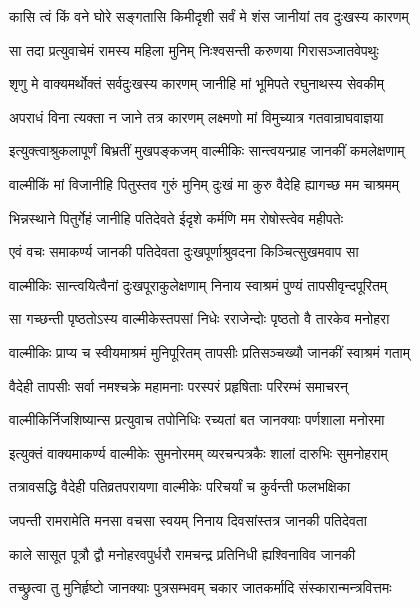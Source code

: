 \twolineshloka
{कासि त्वं किं वने घोरे सङ्गतासि किमीदृशी}
{सर्वं मे शंस जानीयां तव दुःखस्य कारणम्}%

\twolineshloka
{सा तदा प्रत्युवाचेमं रामस्य महिला मुनिम्}
{निःश्वसन्ती करुणया गिरासञ्जातवेपथुः}%

\twolineshloka
{शृणु मे वाक्यमर्थोक्तं सर्वदुःखस्य कारणम्}
{जानीहि मां भूमिपते रघुनाथस्य सेवकीम्}%

\twolineshloka
{अपराधं विना त्यक्ता न जाने तत्र कारणम्}
{लक्ष्मणो मां विमुच्यात्र गतवान्राघवाज्ञया}%

\twolineshloka
{इत्युक्त्वाश्रुकलापूर्णं बिभ्रतीं मुखपङ्कजम्}
{वाल्मीकिः सान्त्वयन्प्राह जानकीं कमलेक्षणाम्}%

\twolineshloka
{वाल्मीकिं मां विजानीहि पितुस्तव गुरुं मुनिम्}
{दुःखं मा कुरु वैदेहि ह्यागच्छ मम चाश्रमम्}%

\twolineshloka
{भिन्नस्थाने पितुर्गेहं जानीहि पतिदेवते}
{ईदृशे कर्मणि मम रोषोस्त्वेव महीपतेः}%

\twolineshloka
{एवं वचः समाकर्ण्य जानकी पतिदेवता}
{दुःखपूर्णाश्रुवदना किञ्चित्सुखमवाप सा}%


\twolineshloka
{वाल्मीकिः सान्त्वयित्वैनां दुःखपूराकुलेक्षणाम्}
{निनाय स्वाश्रमं पुण्यं तापसीवृन्दपूरितम्}%

\twolineshloka
{सा गच्छन्ती पृष्ठतोऽस्य वाल्मीकेस्तपसां निधेः}
{रराजेन्दोः पृष्ठतो वै तारकेव मनोहरा}%

\twolineshloka
{वाल्मीकिः प्राप्य च स्वीयमाश्रमं मुनिपूरितम्}
{तापसीः प्रतिसञ्चख्यौ जानकीं स्वाश्रमं गताम्}%

\twolineshloka
{वैदेही तापसीः सर्वा नमश्चक्रे महामनाः}
{परस्परं प्रहृषिताः परिरम्भं समाचरन्}%

\twolineshloka
{वाल्मीकिर्निजशिष्यान्स प्रत्युवाच तपोनिधिः}
{रच्यतां बत जानक्याः पर्णशाला मनोरमा}%

\twolineshloka
{इत्युक्तं वाक्यमाकर्ण्य वाल्मीकेः सुमनोरमम्}
{व्यरचन्पत्रकैः शालां दारुभिः सुमनोहराम्}%

\twolineshloka
{तत्रावसद्धि वैदेही पतिव्रतपरायणा}
{वाल्मीकेः परिचर्यां च कुर्वन्ती फलभक्षिका}%

\twolineshloka
{जपन्ती रामरामेति मनसा वचसा स्वयम्}
{निनाय दिवसांस्तत्र जानकी पतिदेवता}%

\twolineshloka
{काले सासूत पूत्रौ द्वौ मनोहरवपुर्धरौ}
{रामचन्द्र प्रतिनिधी ह्यश्विनाविव जानकी}%

\twolineshloka
{तच्छ्रुत्वा तु मुनिर्हृष्टो जानक्याः पुत्रसम्भवम्}
{चकार जातकर्मादि संस्कारान्मन्त्रवित्तमः}%

